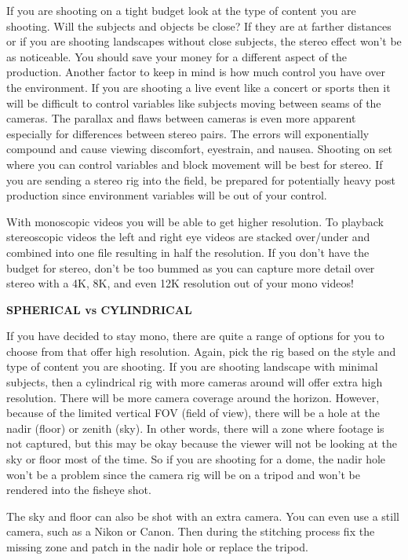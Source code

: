 \begin{fullwidth}
If you are shooting on a tight budget look at the type of content you are shooting. Will the subjects and objects be close? If they are at farther distances or if you are shooting landscapes without close subjects, the stereo effect won’t be as noticeable. You should save your money for a different aspect of the production. Another factor to keep in mind is how much control you have over the environment. If you are shooting a live event like a concert or sports then it will be difficult to control variables like subjects moving between seams of the cameras. The parallax and flaws between cameras is even more apparent especially for differences between stereo pairs. The errors will exponentially compound and cause viewing discomfort, eyestrain, and nausea. Shooting on set where you can control variables and block movement will be best for stereo. If you are sending a stereo rig into the field, be prepared for potentially heavy post production since environment variables will be out of your control. 

With monoscopic videos you will be able to get higher resolution. To playback stereoscopic videos the left and right eye videos are stacked over/under and combined into one file resulting in half the resolution. If you don’t have the budget for stereo, don’t be too bummed as you can capture more detail over stereo with a 4K, 8K, and even 12K resolution out of your mono videos!

{\bfseries SPHERICAL vs CYLINDRICAL}


If you have decided to stay mono, there are quite a range of options for you to choose from that offer high resolution. Again, pick the rig based on the style and type of content you are shooting. If you are shooting landscape with minimal subjects, then a cylindrical rig with more cameras around will offer extra high resolution. There will be more camera coverage around the horizon. However, because of the limited vertical FOV (field of view), there will be a hole at the nadir (floor) or zenith (sky). In other words, there will a zone where footage is not captured, but this may be okay because the viewer will not be looking at the sky or floor most of the time. So if you are shooting for a dome, the nadir hole won’t be a problem since the camera rig will be on a tripod and won't be rendered into the fisheye shot.

The sky and floor can also be shot with an extra camera. You can even use a still camera, such as a Nikon or Canon. Then during the stitching process fix the missing zone and patch in the nadir hole or replace the tripod. 


\end{fullwidth}
